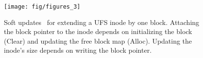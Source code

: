 \begin{comment}
appr to the
block out when a block is removed from a file, we create (at least) two
\chdescs\ in most file systems: one that clears out the reference to that
block number in the file's list of blocks, and one that marks the block as
free. By hooking up the second \chdesc\ to depend upon the first, we can
implement the soft updates semantic straightforwardly. Another example is
depicted in Figure~\ref{fig:softupdate}.
\end{comment}

\begin{figure}[htb]
  \centering
  \texttt{[image: fig/figures\_3]}
  \caption{\label{fig:softupdate} Soft updates \patches\
  for extending a UFS inode by one block.
  Attaching the block pointer to the inode depends on
  initializing the block (Clear) and updating the free block map (Alloc).
  Updating the inode's size depends on writing the block
  pointer.}
\end{figure}


\begin{comment}
The \Kudos\ approach can take more memory than the BSD soft updates approach,
which limits the state required by any individual file system operation; we do
not yet address the issue of memory exhaustion.
%
However, \Kudos\ separates dependency enforcement from dependency
specification. This makes the actual implementation easier to read, and allows
the dependency structure to be examined and modified by other \modules\ of the
system that may not have any idea what the changes are actually doing.
\end{comment}
